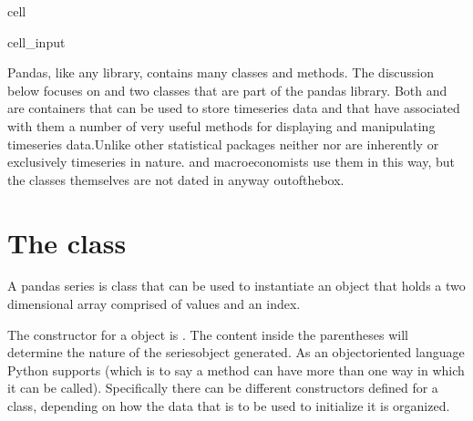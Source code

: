 \documentclass[letterpaper,10pt,english]{jupyterBook}
\begin{document}
\begin{sphinxuseclass}{cell}\begin{sphinxVerbatimInput}

\begin{sphinxuseclass}{cell_input}
\begin{sphinxVerbatim}[commandchars=\\\{\}]
    
\end{sphinxVerbatim}

\end{sphinxuseclass}\end{sphinxVerbatimInput}

\end{sphinxuseclass}
\sphinxAtStartPar
Pandas, like any library, contains many classes and methods.  The discussion below focuses on  and  two classes that are part of the pandas library.  Both  and  are containers that can be used to store time\sphinxhyphen{}series data and that have associated with them a number of very useful methods for displaying and manipulating time\sphinxhyphen{}series data.Unlike other statistical packages neither  nor  are inherently or exclusively time\sphinxhyphen{}series in nature.   and macro\sphinxhyphen{}economists use them in this way, but the classes themselves are not dated in anyway out\sphinxhyphen{}of\sphinxhyphen{}the\sphinxhyphen{}box.


\section{The  class }
\label{\detokenize{content/04_PythonEssentials/PythonPandasDataframes:the-pandas-class-series}}
\sphinxAtStartPar
A pandas series is class that can be used to instantiate an object that holds a two dimensional array comprised of values and an index.

\sphinxAtStartPar
The constructor for a  object is .  The content inside the parentheses will determine the nature of the series\sphinxhyphen{}object generated.  As an object\sphinxhyphen{}oriented language Python supports  (which is to say a method can have more than one way in which it can be called). Specifically there can be different constructors defined for a class, depending on how the data that is to be used to initialize it is organized.
\end{document}
